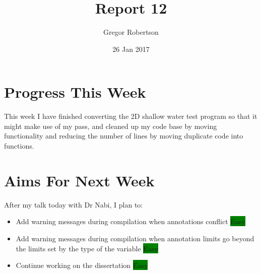 \documentclass{article}
\title{Report 12}
\author{Gregor Robertson}
\date{26 Jan 2017}
\begin{document}
 
\maketitle
 
\section*{Progress This Week}
This week I have finished converting the 2D shallow water test program so that it might make use of my pass, and cleaned up my code base by moving functionality and reducing the number of lines by moving duplicate code into functions. 

\section*{Aims For Next Week}
After my talk today with Dr Nabi, I plan to:
\begin{itemize}
	\item Add warning messages during compilation when annotations conflict \colorbox{Green}{\color{Black}Easy}
	\item Add warning messages during compilation when annotation limits go beyond the limits set by the type of the variable \colorbox{Green}{\color{Black}Easy}
	\item Continue working on the dissertation \colorbox{Green}{\color{Black}Easy}
\end{itemize}

\medskip
 
\printbibliography
\end{document}
